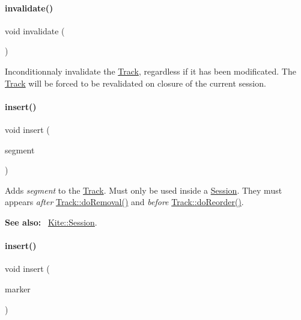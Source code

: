 \paragraph{\texorpdfstring{invalidate()}{invalidate()}}
{\footnotesize\ttfamily void invalidate (\begin{DoxyParamCaption}{ }\end{DoxyParamCaption})}

Inconditionnaly invalidate the \mbox{\hyperlink{classKite_1_1Track}{Track}}, regardless if it has been modificated. The \mbox{\hyperlink{classKite_1_1Track}{Track}} will be forced to be revalidated on closure of the current session. \mbox{\label{classKite_1_1Track_aa392ba7cf1e3e485aac11cf326e31918}} 
\paragraph{\texorpdfstring{insert()}{insert()}\hspace{0.1cm}{\footnotesize\ttfamily [1/2]}}
{\footnotesize\ttfamily void insert (\begin{DoxyParamCaption}\item[{\mbox{\hyperlink{classKite_1_1TrackElement}{Track\+Element}} $\ast$}]{segment }\end{DoxyParamCaption})}

Adds {\itshape segment} to the \mbox{\hyperlink{classKite_1_1Track}{Track}}. Must only be used inside a \mbox{\hyperlink{classKite_1_1Session}{Session}}. They must appears {\itshape after} \mbox{\hyperlink{classKite_1_1Track_abfffcd781865b94f62f27a1e7be99a38}{Track\+::do\+Removal()}} and {\itshape before} \mbox{\hyperlink{classKite_1_1Track_aaccb9224f5b38ecd8506fd1eec9ef5ca}{Track\+::do\+Reorder()}}.

{\bfseries See also\+:}~ \mbox{\hyperlink{classKite_1_1Session}{Kite\+::\+Session}}. \mbox{\label{classKite_1_1Track_a31e8f4502866435ac898c7eec741175f}} 
\paragraph{\texorpdfstring{insert()}{insert()}\hspace{0.1cm}{\footnotesize\ttfamily [2/2]}}
{\footnotesize\ttfamily void insert (\begin{DoxyParamCaption}\item[{\mbox{\hyperlink{classKite_1_1TrackMarker}{Track\+Marker}} $\ast$}]{marker }\end{DoxyParamCaption})}

